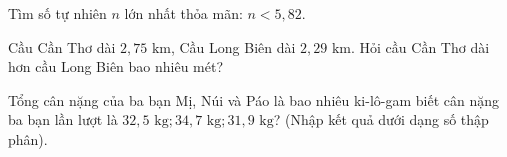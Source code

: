 \begin{ex} %
Tìm số tự nhiên $n$ lớn nhất thỏa mãn: $n < 5{,}82$.
\end{ex}

\begin{ex} %
Cầu Cần Thơ dài $2{,}75\text{ km}$, Cầu Long Biên dài $2{,}29\text{ km}$. Hỏi cầu Cần Thơ dài hơn cầu Long Biên bao nhiêu mét?
\end{ex}

\begin{ex} %
Tổng cân nặng của ba bạn Mị, Núi và Páo là bao nhiêu ki-lô-gam biết cân nặng ba bạn lần lượt là $32{,}5\text{ kg}; 34{,}7\text{ kg}; 31{,}9\text{ kg}$? (Nhập kết quả dưới dạng số thập phân).
\end{ex}
